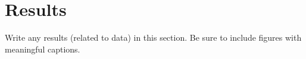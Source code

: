 \section{Results}

Write any results (related to data) in this section. Be sure to include figures with meaningful captions.